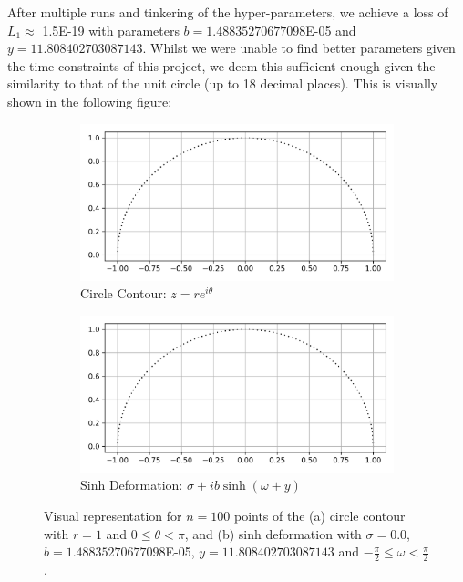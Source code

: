 \documentclass[a4paper]{report}
\begin{document}
After multiple runs and tinkering of the hyper-parameters, we achieve a loss of $L_1 \approx$ 1.5E-19 with parameters $b = 1.48835270677098$E-05 and $y = 11.808402703087143$. Whilst we were unable to find better parameters given the time constraints of this project, we deem this sufficient enough given the similarity to that of the unit circle (up to 18 decimal places). This is visually shown in the following figure:
\begin{figure}[H]
    \begin{subfigure}{.5\linewidth}
      \includegraphics[width=\linewidth]{images/gd/unit_circle.png}
      \caption{Circle Contour: $z = re^{i\theta}$}
      \label{fig:circle_contour}
    \end{subfigure}\hfill
    \begin{subfigure}{.5\linewidth}
      \includegraphics[width=\linewidth]{images/gd/best_params.png}
      \caption{Sinh Deformation: $\sigma + ib\sinh(\omega + y)$}
      \label{fig:perfect_sinh}
    \end{subfigure}
    
    \caption{Visual representation for $n = 100$ points of the (a) circle contour with $r = 1$ and $0 \leq \theta < \pi$, and (b) sinh deformation with $\sigma = 0.0$, $b = 1.48835270677098$E-05, $y = 11.808402703087143$ and $-\frac{\pi}{2} \leq \omega < \frac{\pi}{2}$.}
\end{figure}
\end{document}
